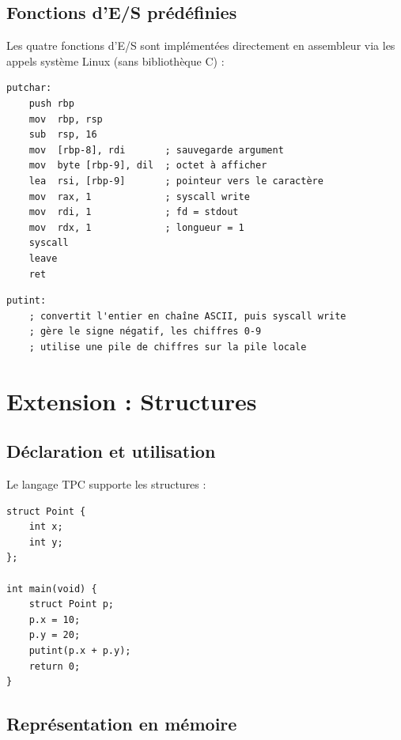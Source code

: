 \documentclass[12pt,a4paper]{article}
\begin{document}
\subsection{Fonctions d'E/S prédéfinies}

Les quatre fonctions d'E/S sont implémentées directement en assembleur via les
appels système Linux (sans bibliothèque C) :

\begin{lstlisting}[language={[x86masm]Assembler}, caption={Implémentation de putchar en NASM}]
putchar:
    push rbp
    mov  rbp, rsp
    sub  rsp, 16
    mov  [rbp-8], rdi       ; sauvegarde argument
    mov  byte [rbp-9], dil  ; octet à afficher
    lea  rsi, [rbp-9]       ; pointeur vers le caractère
    mov  rax, 1             ; syscall write
    mov  rdi, 1             ; fd = stdout
    mov  rdx, 1             ; longueur = 1
    syscall
    leave
    ret
\end{lstlisting}

\begin{lstlisting}[language={[x86masm]Assembler}, caption={Implémentation de putint en NASM (extrait)}]
putint:
    ; convertit l'entier en chaîne ASCII, puis syscall write
    ; gère le signe négatif, les chiffres 0-9
    ; utilise une pile de chiffres sur la pile locale
\end{lstlisting}

\section{Extension : Structures}

\subsection{Déclaration et utilisation}

Le langage TPC supporte les structures :

\begin{lstlisting}[language=TPC, caption={Exemple d'utilisation d'une structure}]
struct Point {
    int x;
    int y;
};

int main(void) {
    struct Point p;
    p.x = 10;
    p.y = 20;
    putint(p.x + p.y);
    return 0;
}
\end{lstlisting}

\subsection{Représentation en mémoire}
\end{document}
